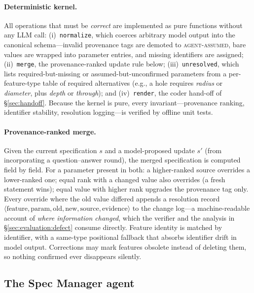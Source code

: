 \paragraph{Deterministic kernel.}
All operations that must be \emph{correct} are implemented as pure functions
without any LLM call:
(i)~\texttt{normalize}, which coerces arbitrary model output into the
canonical schema---invalid provenance tags are demoted to
\textsc{agent-assumed}, bare values are wrapped into parameter entries, and
missing identifiers are assigned;
(ii)~\texttt{merge}, the provenance-ranked update rule below;
(iii)~\texttt{unresolved}, which lists required-but-missing or
assumed-but-unconfirmed parameters from a per-feature-type table of required
alternatives (e.g., a hole requires \textit{radius} or \textit{diameter},
plus \textit{depth} or \textit{through}); and
(iv)~\texttt{render}, the coder hand-off of \S\ref{sec:handoff}.
Because the kernel is pure, every invariant---provenance ranking, identifier
stability, resolution logging---is verified by offline unit tests.

\paragraph{Provenance-ranked merge.}
Given the current specification $s$ and a model-proposed update $s'$ (from
incorporating a question--answer round), the merged specification is computed
field by field. For a parameter present in both:
a higher-ranked source overrides a lower-ranked one;
equal rank with a changed value also overrides (a fresh statement wins);
equal value with higher rank upgrades the provenance tag only.
Every override where the old value differed appends a resolution record
$\langle \text{feature},\text{param},\text{old},\text{new},\text{source},
\text{evidence}\rangle$ to the change log---a machine-readable account of
\emph{where information changed}, which the verifier and the analysis in
\S\ref{sec:evaluation:defect} consume directly. Feature identity is matched by
identifier, with a same-type positional fallback that absorbs identifier drift
in model output. Corrections may mark features obsolete instead of deleting
them, so nothing confirmed ever disappears silently.

\subsection{The Spec Manager agent}\label{sec:specmanager}

